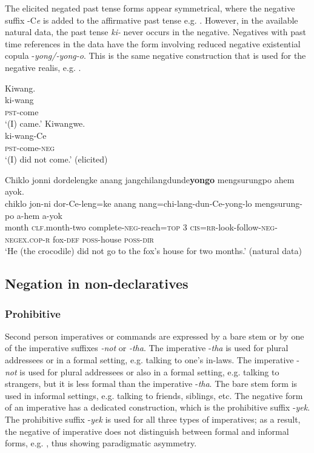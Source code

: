 \documentclass[output=paper,colorlinks,citecolor=brown]{langscibook}
\begin{document}
The elicited negated past tense forms appear symmetrical, where the negative suffix -C\textit{e} is added to the affirmative past tense e.g. . However, in the available natural data, the past tense \textit{ki-} never occurs in the negative. Negatives with past time references in the data have the form involving reduced negative existential copula -\textit{yong/-yong-o}. This is the same negative construction that is used for the negative realis, e.g. . 

{\ea\label{ex:amr:10}
    \ea\label{ex:amr:10a}Kiwang.  \\
        \gll  ki-wang \\
              \textsc{pst}{}-come \\
        \glt ‘(I) came.’ 
    \ex\label{ex:amr:10b}  Kiwangwe. \\
        \gll ki-wang-Ce\\
              \textsc{pst}{}-come-\textsc{neg} \\
        \glt  ‘(I) did not come.’ (elicited)
    \z
\z}

\ea\label{ex:amr:11} Chiklo jonni dordelengke anang jangchilangdunde\textbf{yongo} mengsurungpo ahem ayok.\\ 
    \gll chiklo jon-ni dor-Ce-leng=ke anang nang=chi-lang-dun-Ce-yong-lo mengsurung-po a-hem a-yok\\
    month \textsc{clf}.month-two complete-\textsc{neg}{}-reach=\textsc{top} 3 \textsc{cis=rr}-look-follow-\textsc{neg}{}-\textsc{negex}.\textsc{cop}{}-\textsc{r} fox-\textsc{def} \textsc{poss}{}-house \textsc{poss}{}-\textsc{dir}\\
    \glt ‘He (the crocodile) did not go to the fox’s house for two months.’  (natural data)
\z 

\subsection{Negation in non-declaratives}\label{sec:amr:2.2}
\subsubsection{Prohibitive}\label{sec:amr:2.2.1}
Second person imperatives or commands are expressed by a bare stem or by one of the imperative suffixes \textit{{}-not} or \textit{{}-tha}. The imperative -\textit{tha} is used for plural addressees or in a formal setting, e.g. talking to one’s in-laws. The imperative -\textit{not} is used for plural addressees or also in a formal setting, e.g. talking to strangers, but it is less formal than the imperative -\textit{tha}. The bare stem form is used in informal settings, e.g. talking to friends, siblings, etc. The negative form of an imperative has a dedicated construction, which is the prohibitive suffix -\textit{yek}. The prohibitive suffix -\textit{yek} is used for all three types of imperatives; as a result, the negative of imperative does not distinguish between formal and informal forms, e.g. , thus showing paradigmatic asymmetry.
\end{document}
